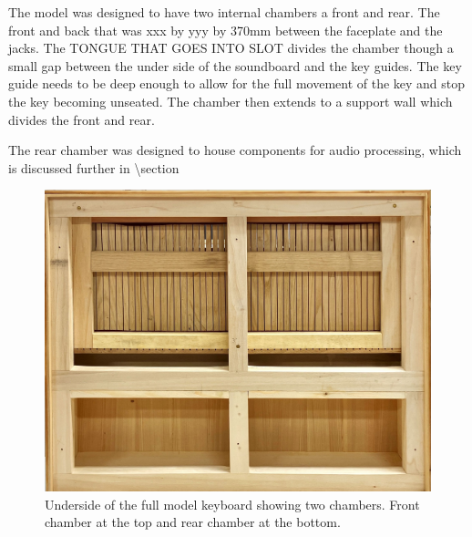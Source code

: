 
The model was designed to have two internal chambers a front and rear.
The front and back that was xxx by yyy by 370mm between the faceplate
and the jacks. The TONGUE THAT GOES INTO SLOT divides the chamber though
a small gap between the under side of the soundboard and the key guides.
The key guide needs to be deep enough to allow for the full movement of
the key and stop the key becoming unseated. The chamber then extends to
a support wall which divides the front and rear.


The rear chamber was designed to house components for audio processing,
which is discussed further in \textbackslash section

\begin{figure}  
  \centering
  \includegraphics[width=\linewidth]{images/49-key-bottom.jpeg} 
  \caption{Underside of the full model keyboard showing two chambers. Front chamber at the top and rear chamber at the bottom.} 
  \Description{} 
  \label{fig:49-key-bottom}
\end{figure}

